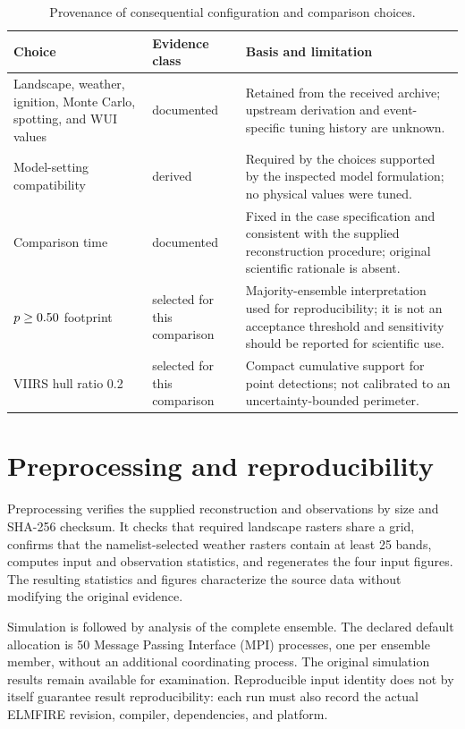 \begin{table}[H]
\centering
\begin{tabular}{@{}p{}p{}p{}@{}}
\toprule
Choice & Evidence class & Basis and limitation \\
\midrule
Landscape, weather, ignition, Monte Carlo, spotting, and WUI values & documented & Retained from the received archive; upstream derivation and event-specific tuning history are unknown. \\
Model-setting compatibility & derived & Required by the choices supported by the inspected model formulation; no physical values were tuned. \\
Comparison time & documented & Fixed in the case specification and consistent with the supplied reconstruction procedure; original scientific rationale is absent. \\
$p\geq0.50$ footprint & selected for this comparison & Majority-ensemble interpretation used for reproducibility; it is not an acceptance threshold and sensitivity should be reported for scientific use. \\
VIIRS hull ratio 0.2 & selected for this comparison & Compact cumulative support for point detections; not calibrated to an uncertainty-bounded perimeter. \\
\bottomrule
\end{tabular}
\caption{Provenance of consequential configuration and comparison choices.}
\end{table}

\section{Preprocessing and reproducibility}

Preprocessing verifies the supplied reconstruction and observations by size
and SHA-256 checksum.  It checks that required landscape rasters share a grid, confirms that
the namelist-selected weather rasters contain at least 25 bands, computes input
and observation statistics, and regenerates the four input figures.  The resulting statistics and figures characterize the source data without
modifying the original evidence.

Simulation is followed by analysis of the complete ensemble. The declared
default allocation is 50 Message Passing Interface (MPI) processes, one per
ensemble member, without an additional coordinating process. The original
simulation results remain available for examination.  Reproducible input identity does not by itself guarantee result
reproducibility: each run must also record the actual ELMFIRE revision,
compiler, dependencies, and platform.

